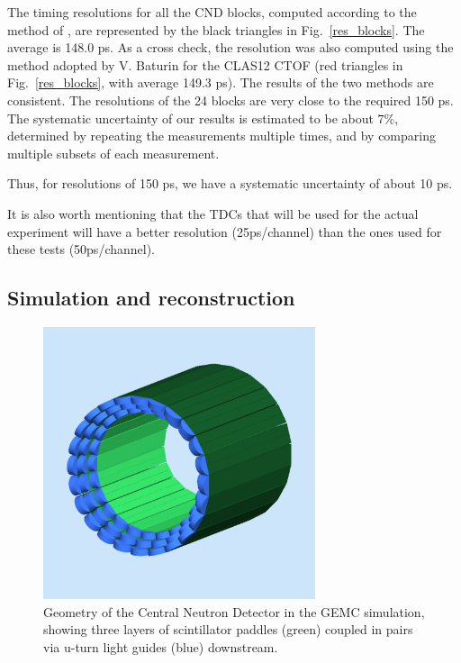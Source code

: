 The timing resolutions for all the CND blocks, computed according to the method of \cite{elton_paper}, are represented by the black triangles in Fig.~\ref{res_blocks}. The average is 148.0 ps. As a cross check, the resolution was also computed using the method adopted by V. Baturin for the CLAS12 CTOF \cite{vitali} (red triangles in Fig.~\ref{res_blocks}, with average 149.3 ps). The results of the two methods are consistent. The resolutions of the 24 blocks are very close to the required 150 ps. The systematic uncertainty of our results is estimated to be about $7\%$, determined by repeating the measurements multiple times, and by comparing multiple subsets of each measurement. 

Thus, for resolutions of 150 ps, we have a systematic uncertainty of about 10 ps.

It is also worth mentioning that the TDCs that will be used for the actual experiment will have a better resolution (25ps/channel) than the ones used for these tests (50ps/channel).

\subsection{Simulation and reconstruction}\label{sim_sec}
\begin{figure}[htb]
\begin{center}
\includegraphics[width=80mm]{CND_4.pdf}
\caption {Geometry of the Central Neutron Detector in the GEMC simulation, showing three layers of scintillator paddles (green) coupled in pairs via u-turn light guides (blue) downstream.}
\label{cnd_gemc}
\end{center}
\end{figure}

